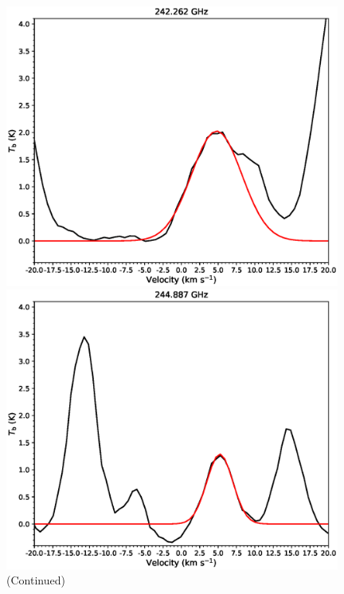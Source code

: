 \begin{figure}[htbp]
\begin{center}
\begin{minipage}{0.98\textwidth} 
\begin{center}
\begin{minipage}{0.48\textwidth}
\begin{center}
\includegraphics[width=0.98\textwidth]{OrionKL/spectrum/HC/242.2620195w_fit.eps}
\end{center}
\end{minipage}
\begin{minipage}{0.48\textwidth}
\begin{center}
\includegraphics[width=0.98\textwidth]{OrionKL/spectrum/HC/244.8869007w_fit.eps}
\end{center}
\end{minipage}
\end{center}
\end{minipage}

\caption{(Continued)}
\end{center}
\end{figure}



